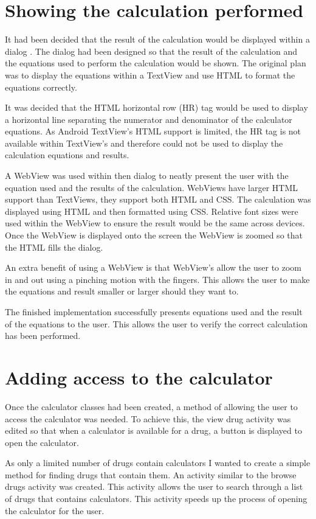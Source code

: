 \section{Showing the calculation performed}

It had been decided that the result of the calculation would be displayed within a dialog \cite{dialog}. The dialog had been designed so that the result of the calculation and the equations used to perform the calculation would be shown. The original plan was to display the equations within a TextView and use HTML to format the equations correctly.

It was decided that the HTML horizontal row (HR) tag would be used to display a horizontal line separating the numerator and denominator of the calculator equations. As Android TextView's HTML support is limited, the HR tag is not available within TextView's and therefore could not be used to display the calculation equations and results.

A WebView was used within then dialog to neatly present the user with the equation used and the results of the calculation. WebViews have larger HTML support than TextViews, they support both HTML and CSS. The calculation was displayed using HTML and then formatted using CSS. Relative font sizes were used within the WebView to ensure the result would be the same across devices. Once the WebView is displayed onto the screen the WebView is zoomed so that the HTML fills the dialog.

An extra benefit of using a WebView is that WebView's allow the user to zoom in and out using a pinching motion with the fingers. This allows the user to make the equations and result smaller or larger should they want to.

The finished implementation successfully presents equations used and the result of the equations to the user. This allows the user to verify the correct calculation has been performed. 

\section{Adding access to the calculator}

Once the calculator classes had been created, a method of allowing the user to access the calculator was needed. To achieve this, the view drug activity was edited so that when a calculator is available for a drug, a button is displayed to open the calculator.

As only a limited number of drugs contain calculators I wanted to create a simple method for finding drugs that contain them. An activity similar to the browse drugs activity was created. This activity allows the user to search through a list of drugs that contains calculators. This activity speeds up the process of opening the calculator for the user.

